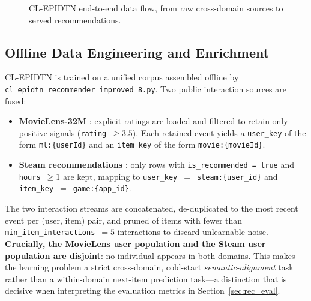 \begin{figure}[htbp]
{
    }
    \caption{CL-EPIDTN end-to-end data flow, from raw cross-domain sources to served recommendations.}
    \label{fig:clepidtn_dataflow}
\end{figure}

\subsection{Offline Data Engineering and Enrichment}
\label{sec:offline_data}
CL-EPIDTN is trained on a unified corpus assembled offline by \texttt{cl\_epidtn\_recommender\_improved\_8.py}. Two public interaction sources are fused:

\begin{itemize}
    \item \textbf{MovieLens-32M} \cite{harper2015movielens, movielens_site}: explicit ratings are loaded and filtered to retain only positive signals (\texttt{rating}~$\geq 3.5$). Each retained event yields a \texttt{user\_key} of the form \texttt{ml:\{userId\}} and an \texttt{item\_key} of the form \texttt{movie:\{movieId\}}.
    \item \textbf{Steam recommendations} \cite{steam_site}: only rows with \texttt{is\_recommended = true} and \texttt{hours}~$\geq 1$ are kept, mapping to \texttt{user\_key}~$=$~\texttt{steam:\allowbreak\{user\_id\}} and \texttt{item\_key}~$=$~\texttt{game:\allowbreak\{app\_id\}}.
\end{itemize}

The two interaction streams are concatenated, de-duplicated to the most recent event per (user, item) pair, and pruned of items with fewer than \texttt{min\_item\_interactions}~$=5$ interactions to discard unlearnable noise. \textbf{Crucially, the MovieLens user population and the Steam user population are disjoint}: no individual appears in both domains. This makes the learning problem a strict cross-domain, cold-start \textit{semantic-alignment} task rather than a within-domain next-item prediction task---a distinction that is decisive when interpreting the evaluation metrics in Section~\ref{sec:rec_eval}.

